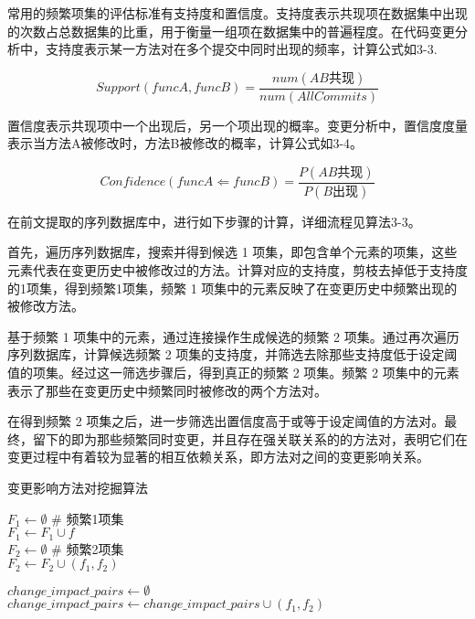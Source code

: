 常用的频繁项集的评估标准有支持度和置信度。支持度表示共现项在数据集中出现的次数占总数据集的比重，用于衡量一组项在数据集中的普遍程度。在代码变更分析中，支持度表示某一方法对在多个提交中同时出现的频率，计算公式如3-3.

\begin{equation}
Support(funcA,funcB)=\frac{num(AB\text{共现})}{num(AllCommits)}
\end{equation}

置信度表示共现项中一个出现后，另一个项出现的概率。变更分析中，置信度度量表示当方法A被修改时，方法B被修改的概率，计算公式如3-4。

\begin{equation}
Confidence(funcA\Leftarrow funcB)=\frac{P(AB\text{共现})}{P(B\text{出现})}
\end{equation}

在前文提取的序列数据库中，进行如下步骤的计算，详细流程见算法3-3。

首先，遍历序列数据库，搜索并得到候选 1 项集，即包含单个元素的项集，这些元素代表在变更历史中被修改过的方法。计算对应的支持度，剪枝去掉低于支持度的1项集，得到频繁1项集，频繁 1 项集中的元素反映了在变更历史中频繁出现的被修改方法。

基于频繁 1 项集中的元素，通过连接操作生成候选的频繁 2 项集。通过再次遍历序列数据库，计算候选频繁 2 项集的支持度，并筛选去除那些支持度低于设定阈值的项集。经过这一筛选步骤后，得到真正的频繁 2 项集。频繁 2 项集中的元素表示了那些在变更历史中频繁同时被修改的两个方法对。

在得到频繁 2 项集之后，进一步筛选出置信度高于或等于设定阈值的方法对。最终，留下的即为那些频繁同时变更，并且存在强关联关系的的方法对，表明它们在变更过程中有着较为显著的相互依赖关系，即方法对之间的变更影响关系。

\clearpage

\begin{algorithm}
\caption{变更影响方法对挖掘算法}
\begin{algorithmic}
\State $F_1 \gets \emptyset$  \# 频繁1项集\\  
 {
     {
        $F_1 \gets F_1 \cup f$
    }
} \\
\State $F_2 \gets \emptyset$  \# 频繁2项集\\ 
 {
     {
        $F_2 \gets F_2 \cup (f_1, f_2)$
    }
}

\State $change\_impact\_pairs \gets \emptyset$ \\ 
 {
     {
        $change\_impact\_pairs \gets change\_impact\_pairs \cup (f_1, f_2)$
    }
}
\end{algorithmic}
\end{algorithm}
    
